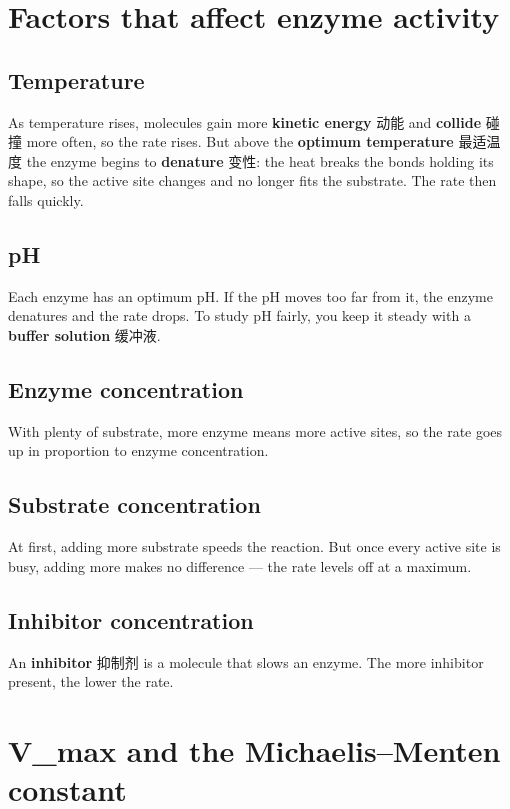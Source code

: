 \documentclass[11pt]{article}
\begin{document}
\section*{Factors that affect enzyme activity}

\subsection*{Temperature}

As temperature rises, molecules gain more \textbf{kinetic energy} 动能 and \textbf{collide} 碰撞 more often, so the rate rises. But above the \textbf{optimum temperature} 最适温度 the enzyme begins to \textbf{denature} 变性: the heat breaks the bonds holding its shape, so the active site changes and no longer fits the substrate. The rate then falls quickly.

\subsection*{pH}

Each enzyme has an optimum pH. If the pH moves too far from it, the enzyme denatures and the rate drops. To study pH fairly, you keep it steady with a \textbf{buffer solution} 缓冲液.

\subsection*{Enzyme concentration}

With plenty of substrate, more enzyme means more active sites, so the rate goes up in proportion to enzyme concentration.

\subsection*{Substrate concentration}

At first, adding more substrate speeds the reaction. But once every active site is busy, adding more makes no difference — the rate levels off at a maximum.

\subsection*{Inhibitor concentration}

An \textbf{inhibitor} 抑制剂 is a molecule that slows an enzyme. The more inhibitor present, the lower the rate.

\section*{V\_max and the Michaelis–Menten constant}
\end{document}
